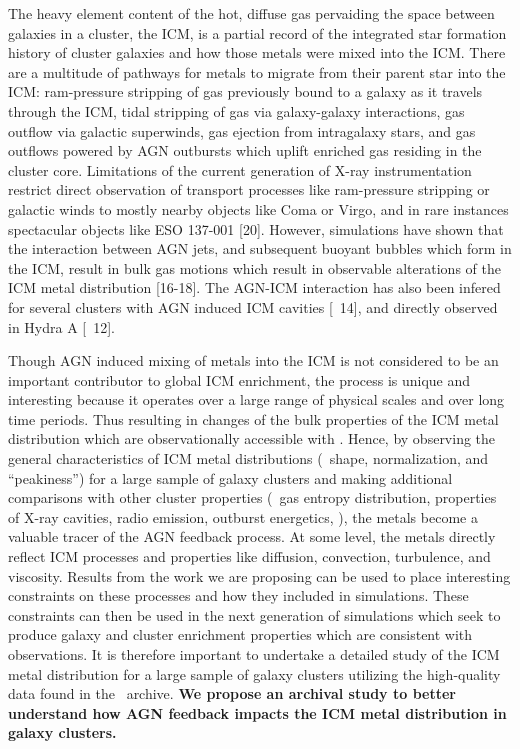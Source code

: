 \documentclass[letterpaper,11pt]{article}
\begin{document}
The heavy element content of the hot, diffuse gas pervaiding the space
between galaxies in a cluster, the ICM, is a partial record of the
integrated star formation history of cluster galaxies and how those
metals were mixed into the ICM. There are a multitude of pathways for
metals to migrate from their parent star into the ICM: ram-pressure
stripping of gas previously bound to a galaxy as it travels through
the ICM, tidal stripping of gas via galaxy-galaxy interactions, gas
outflow via galactic superwinds, gas ejection from intragalaxy stars,
and gas outflows powered by AGN outbursts which uplift enriched gas
residing in the cluster core. Limitations of the current generation of
X-ray instrumentation restrict direct observation of transport
processes like ram-pressure stripping or galactic winds to mostly
nearby objects like Coma or Virgo, and in rare instances spectacular
objects like ESO 137-001 [20]. However, simulations have shown that
the interaction between AGN jets, and subsequent buoyant bubbles which
form in the ICM, result in bulk gas motions which result in observable
alterations of the ICM metal distribution [16-18]. The AGN-ICM
interaction has also been infered for several clusters with AGN
induced ICM cavities [\eg\ 14], and directly observed in Hydra A
[\eg\ 12].

Though AGN induced mixing of metals into the ICM is not considered to
be an important contributor to global ICM enrichment, the process is
unique and interesting because it operates over a large range of
physical scales and over long time periods. Thus resulting in changes
of the bulk properties of the ICM metal distribution which are
observationally accessible with \chandra. Hence, by observing the
general characteristics of ICM metal distributions (\ie\ shape,
normalization, and ``peakiness'') for a large sample of galaxy
clusters and making additional comparisons with other cluster
properties (\eg\ gas entropy distribution, properties of X-ray
cavities, radio emission, outburst energetics, \etc), the metals
become a valuable tracer of the AGN feedback process. At some level,
the metals directly reflect ICM processes and properties like
diffusion, convection, turbulence, and viscosity. Results from the
work we are proposing can be used to place interesting constraints on
these processes and how they included in simulations. These
constraints can then be used in the next generation of simulations
which seek to produce galaxy and cluster enrichment properties which
are consistent with observations. It is therefore important to
undertake a detailed study of the ICM metal distribution for a large
sample of galaxy clusters utilizing the high-quality data found in the
\chandra\ archive. {\bf{We propose an archival study to better
    understand how AGN feedback impacts the ICM metal distribution in
    galaxy clusters.}}
\end{document}
